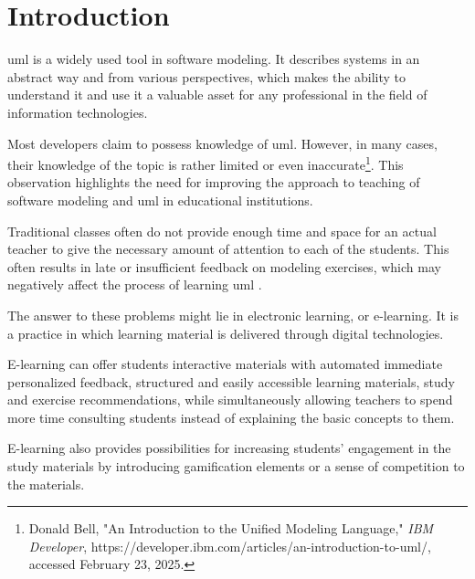 \chapter{Introduction}





\ac{uml} is a widely used tool in software modeling. It describes systems in an abstract way and from various perspectives, which makes the ability to understand it and use it a valuable asset for any professional in the field of information technologies. 

Most developers claim to possess knowledge of \ac{uml}. However, in many cases, their knowledge of the topic is rather limited or even inaccurate\footnote{Donald Bell, "An Introduction to the Unified Modeling Language," \textit{IBM Developer}, https://developer.ibm.com/articles/an-introduction-to-uml/, accessed February 23, 2025.}. This observation highlights the need for improving the approach to teaching of software modeling and \ac{uml} in educational institutions. 

Traditional classes often do not provide enough time and space for an actual teacher to give the necessary amount of attention to each of the students. This often results in late or insufficient feedback on modeling exercises, which may negatively affect the process of learning \ac{uml} \cite{farias2020s}.

The answer to these problems might lie in electronic learning, or e-learning. It is a practice in which learning material is delivered through digital technologies.

E-learning can offer students interactive materials with automated immediate personalized feedback, structured and easily accessible learning materials, study and exercise recommendations, while simultaneously allowing teachers to spend more time consulting students instead of explaining the basic concepts to them.

E-learning also provides possibilities for increasing students' engagement in the study materials by introducing gamification elements or a sense of competition to the materials.

